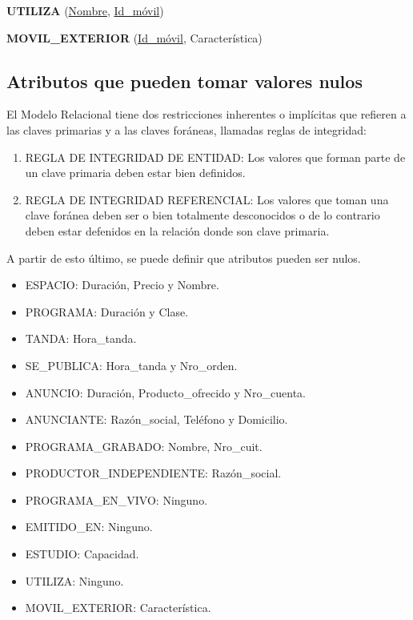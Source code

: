 \documentclass[a4paper,10pt]{article}
\begin{document}
    \begin{flushleft}
      {\bf{UTILIZA}} (\underline{Nombre}, \underline{Id\_m\'ovil})
    \end{flushleft}
  
    \begin{flushleft}
      {\bf{MOVIL\_EXTERIOR}} (\underline{Id\_m\'ovil}, Caracter\'istica)
    \end{flushleft}

  \subsection{Atributos que pueden tomar valores nulos}
    \begin{flushleft}
      El Modelo Relacional tiene dos restricciones inherentes o impl\'icitas que refieren a las claves primarias y a las claves for\'aneas, llamadas reglas de integridad: 
    \end{flushleft}

    \begin{enumerate}
    \item REGLA DE INTEGRIDAD DE ENTIDAD: Los valores que forman parte de un clave primaria deben estar bien definidos.
    \item REGLA DE INTEGRIDAD REFERENCIAL: Los valores que toman una clave for\'anea deben ser o bien totalmente desconocidos o de lo contrario deben estar defenidos en la relaci\'on donde son clave primaria. 
    \end{enumerate}

    \begin{flushleft}
      A partir de esto \'ultimo, se puede definir que atributos pueden ser nulos.
    \end{flushleft}

    \begin{itemize}
      \item ESPACIO: Duraci\'on, Precio y Nombre.
      \item PROGRAMA: Duraci\'on y Clase.
      \item TANDA: Hora\_tanda.
      \item SE\_PUBLICA: Hora\_tanda y Nro\_orden.
      \item ANUNCIO: Duraci\'on, Producto\_ofrecido y Nro\_cuenta.
      \item ANUNCIANTE: Raz\'on\_social, Tel\'efono y Domicilio.
      \item PROGRAMA\_GRABADO: Nombre, Nro\_cuit.
      \item PRODUCTOR\_INDEPENDIENTE: Raz\'on\_social.
      \item PROGRAMA\_EN\_VIVO: Ninguno.
      \item EMITIDO\_EN: Ninguno.
      \item ESTUDIO: Capacidad.
      \item UTILIZA: Ninguno.
      \item MOVIL\_EXTERIOR: Caracter\'istica.
    \end{itemize}
    
\end{document}
